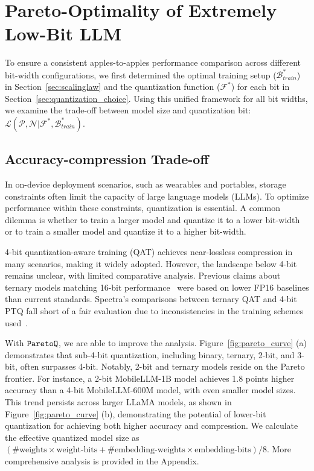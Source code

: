 
\section{Pareto-Optimality of Extremely Low-Bit LLM}\label{sec:pareto_frontier}
To ensure a consistent apples-to-apples performance comparison across different bit-width configurations, we first determined the optimal training setup ($\mathcal{B}_{train}^*$) in Section~\ref{sec:scalinglaw} and the quantization function ($\mathcal{F}^*$) for each bit in Section~\ref{sec:quantization_choice}. Using this unified framework for all bit widths, we examine the trade-off between model size and quantization bit: $\mathcal{L}(\mathcal{P}, \mathcal{N} | \mathcal{F}^*, \mathcal{B}_{train}^*)$.

\subsection{Accuracy-compression Trade-off}
In on-device deployment scenarios, such as wearables and portables, storage constraints often limit the capacity of large language models (LLMs). To optimize performance within these constraints, quantization is essential. A common dilemma is whether to train a larger model and quantize it to a lower bit-width or to train a smaller model and quantize it to a higher bit-width.

4-bit quantization-aware training (QAT) achieves near-lossless compression in many scenarios, making it widely adopted. However, the landscape below 4-bit remains unclear, with limited comparative analysis. Previous claims about ternary models matching 16-bit performance~\cite{ma2024era} were based on lower FP16 baselines than current standards. Spectra's comparisons between ternary QAT and 4-bit PTQ fall short of a fair evaluation due to inconsistencies in the training schemes used~\cite{spectra}.

With $\texttt{ParetoQ}{}$, we are able to improve the analysis. Figure~\ref{fig:pareto_curve} (a) demonstrates that sub-4-bit quantization, including binary, ternary, 2-bit, and 3-bit, often surpasses 4-bit. Notably, 2-bit and ternary models reside on the Pareto frontier. For instance, a 2-bit MobileLLM-1B model achieves 1.8 points higher accuracy than a 4-bit MobileLLM-600M model, with even smaller model sizes. This trend persists across larger LLaMA models, as shown in Figure~\ref{fig:pareto_curve} (b), demonstrating the potential of lower-bit quantization for achieving both higher accuracy and compression. We calculate the effective quantized model size as $(\#\text{weights} \times \text{weight-bits}+ \#\text{embedding-weights} \times \text{embedding-bits})/8$. More comprehensive analysis is provided in the Appendix.

